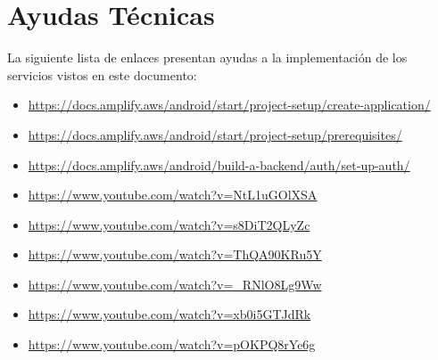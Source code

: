 \documentclass[a4paper,10pt, oneside, titlepage]{article}
\begin{document}
	\section{Ayudas Técnicas}
	La siguiente lista de enlaces presentan ayudas a la implementación de los servicios vistos en este documento:
	\begin{itemize}
		\item \textcolor{blue}{\url{https://docs.amplify.aws/android/start/project-setup/create-application/}}
		\item \textcolor{blue}{\url{https://docs.amplify.aws/android/start/project-setup/prerequisites/}}
		\item \textcolor{blue}{\url{https://docs.amplify.aws/android/build-a-backend/auth/set-up-auth/}}
		\item \textcolor{blue}{\url{https://www.youtube.com/watch?v=NtL1uGOlXSA}}
		\item \textcolor{blue}{\url{https://www.youtube.com/watch?v=s8DiT2QLyZc}}
		\item \textcolor{blue}{\url{https://www.youtube.com/watch?v=ThQA90KRu5Y}}
		\item \textcolor{blue}{\url{https://www.youtube.com/watch?v=_RNlO8Lg9Ww}}
       \item \textcolor{blue}{\url{https://www.youtube.com/watch?v=xb0i5GTJdRk}}
       \item \textcolor{blue}{\url{https://www.youtube.com/watch?v=pOKPQ8rYe6g}}
	\end{itemize}
		
	
	
\end{document}
